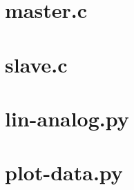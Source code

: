\documentclass[journal]{IEEEtran}
\begin{document}
\clearpage %
\onecolumn
\appendices

\section{master.c}
\label{master.c}


\section{slave.c}
\label{slave.c}


\section{lin-analog.py}
\label{lin-analog.py}


\section{plot-data.py}
\label{plot-data.py}

\end{document}
